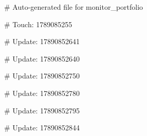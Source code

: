 # Auto-generated file for monitor_portfolio

# Touch: 1789085255

# Update: 17890852641

# Update: 17890852640

# Update: 17890852750

# Update: 17890852780

# Update: 17890852795

# Update: 17890852844
